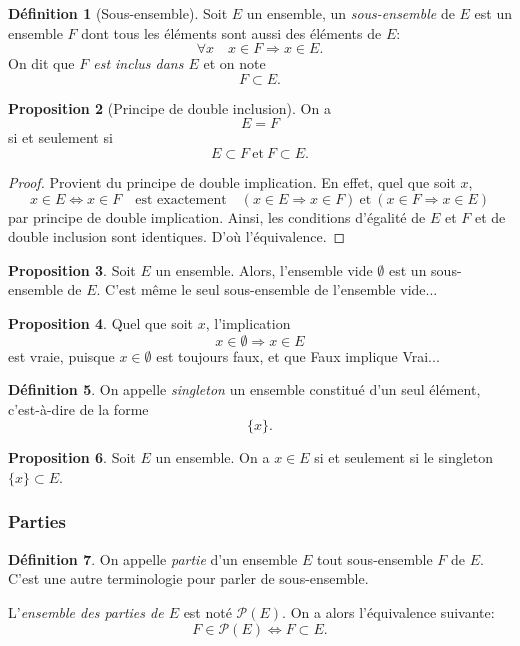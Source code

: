 \documentclass[11pt]{article}
\theoremstyle{definition}
\newtheorem{defn}{Définition}[section]
\newtheorem{prop}[defn]{Proposition}
\theoremstyle{remark}
\begin{document}
\begin{defn}[Sous-ensemble]
Soit $E$ un ensemble, un \textit{sous-ensemble} de $E$ est un ensemble $F$ dont tous les éléments sont aussi des éléments de $E$:
\[ 
\forall x\quad x\in F\Longrightarrow x\in E.
\]
On dit que \textit{$F$ est inclus dans $E$} et on note
\[ F\subset E. \]
\end{defn}

\begin{prop}[Principe de double inclusion]
On a
\[E=F\]
si et seulement si
\[E\subset F\ \text{et}\ F\subset E.\]
\end{prop}

\begin{proof}
Provient du principe de double implication. En effet, quel que soit $x$, 
\[x\in E\Longleftrightarrow x\in F \quad\text{est exactement} \quad (x\in E\Longrightarrow x\in F)\ \text{et}\ (x\in F\Longrightarrow x\in E)\]
par principe de double implication. Ainsi, les conditions d'égalité de $E$ et $F$ et de double inclusion sont identiques. D'où l'équivalence.
\end{proof}

\begin{prop}
Soit $E$ un ensemble. Alors, l'ensemble vide $\emptyset$ est un sous-ensemble de $E$. C'est même le seul sous-ensemble de l'ensemble vide...
\end{prop}

\begin{prop}
Quel que soit $x$, l'implication
\[ x\in\emptyset \Rightarrow x\in E \]
est vraie, puisque $x\in\emptyset$ est toujours faux, et que Faux implique Vrai...
\end{prop}

\begin{defn}
On appelle \textit{singleton} un ensemble constitué d'un seul élément, c'est-à-dire de la forme
\[
\{x \}.
\]
\end{defn}

\begin{prop}
Soit $E$ un ensemble. On a $x\in E$ si et seulement si le singleton $\{x\}\subset E$.
\end{prop}

\subsubsection{Parties}

\begin{defn}
On appelle \textit{partie} d'un ensemble $E$ tout sous-ensemble $F$ de $E$. C'est une autre terminologie pour parler de sous-ensemble.

L'\textit{ensemble des parties de $E$} est noté $\mathcal P(E)$. On a alors l'équivalence suivante:
\[ F\in\mathcal P(E) \Longleftrightarrow F\subset E.\]
\end{defn}
\end{document}
